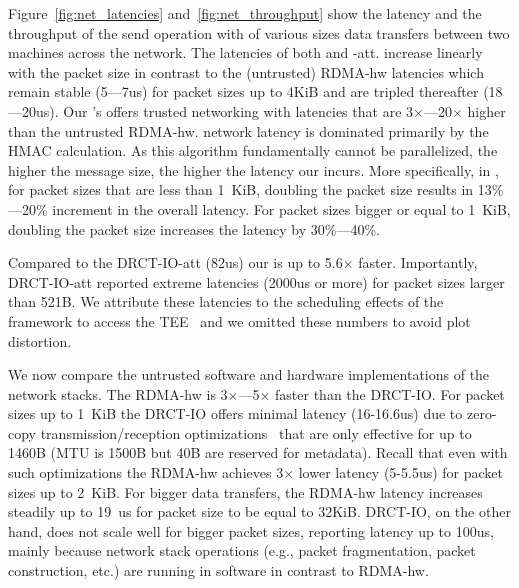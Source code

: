 Figure~\ref{fig:net_latencies} and~\ref{fig:net_throughput} show the latency and the throughput of the send operation with of various sizes data transfers between two machines across the network. The latencies of both \projecttitle{} and \projecttitle{}-att. increase linearly with the packet size in contrast to the (untrusted) RDMA-hw latencies which remain stable (5---7us) for packet sizes up to 4KiB and are tripled thereafter (18---20us). Our \projecttitle{}'s offers trusted networking with latencies that are 3$\times$---20$\times$ higher than the untrusted RDMA-hw. \projecttitle{} network latency is dominated primarily by the HMAC calculation. As this algorithm fundamentally cannot be parallelized, the higher the message size, the higher the latency our \projecttitle{} incurs. More specifically, in \projecttitle{}, for packet sizes that are less than 1~KiB, doubling the packet size results in 13\%---20\% increment in the overall latency. For packet sizes bigger or equal to 1~KiB, doubling the packet size increases the latency by 30\%---40\%. 

Compared to the DRCT-IO-att (82us) our \projecttitle{} is up to 5.6$\times$ faster. Importantly, DRCT-IO-att reported extreme latencies (2000us or more) for packet sizes larger than 521B. We attribute these latencies to the scheduling effects of the framework to access the TEE~\cite{scone} and we omitted these numbers to avoid plot distortion.

We now compare the untrusted software and hardware implementations of the network stacks. The RDMA-hw is 3$\times$---5$\times$ faster than the DRCT-IO. For packet sizes up to 1~KiB the DRCT-IO offers minimal latency (16-16.6us) due to zero-copy transmission/reception optimizations~\cite{erpc} that are only effective for up to 1460B (MTU is 1500B but 40B are reserved for metadata). Recall that even with such optimizations the RDMA-hw achieves 3$\times$ lower latency (5-5.5us) for packet sizes up to 2~KiB.  For bigger data transfers, the RDMA-hw latency increases steadily up to 19~us for packet size to be equal to 32KiB. DRCT-IO, on the other hand, does not scale well for bigger packet sizes, reporting latency up to 100us, mainly because network stack operations (e.g., packet fragmentation, packet construction, etc.) are running in software in contrast to RDMA-hw. 




